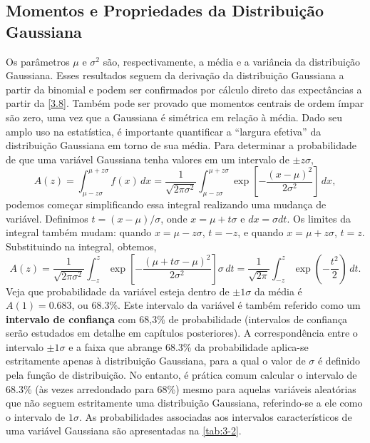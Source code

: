 \subsection{Momentos e Propriedades da Distribuição Gaussiana}

Os parâmetros $\mu$ e $\sigma^2$ são, respectivamente, a média e a variância da distribuição Gaussiana. Esses resultados seguem da derivação da distribuição Gaussiana a partir da binomial e podem ser confirmados por cálculo direto das expectâncias a partir da \autoref{3.8}. Também pode ser provado que momentos centrais de ordem ímpar são zero, uma vez que a Gaussiana é simétrica em relação à média. Dado seu amplo uso na estatística, é importante quantificar a ``largura efetiva'' da distribuição Gaussiana em torno de sua média. Para determinar a probabilidade de que uma variável Gaussiana tenha valores em um intervalo de $\pm z\sigma$,
\begin{equation*}
A(z) = \int_{\mu - z \sigma}^{\mu + z \sigma} f(x) \, dx = \dfrac{1}{\sqrt{2\pi\sigma^2}} \int_{\mu - z \sigma}^{\mu + z \sigma}  \exp\left[-\dfrac{(x - \mu)^2}{2\sigma^2}\right] \, dx,
\end{equation*}
podemos começar simplificando essa integral realizando uma mudança de variável. Definimos $t = (x - \mu) / \sigma$, onde $x = \mu + t\sigma$ e $dx = \sigma dt$. Os limites da integral também mudam: quando $x = \mu - z\sigma$, $t = -z$, e quando $x = \mu + z\sigma$, $t = z$. Substituindo na integral, obtemos,
\begin{equation}\label{3.11}
A(z) = \dfrac{1}{\sqrt{2\pi\sigma^2}} \int_{-z}^{z} \exp\left[-\dfrac{(\mu + t\sigma - \mu)^2}{2\sigma^2}\right] \sigma \,dt = \dfrac{1}{\sqrt{2\pi}} \int_{-z}^{z} \exp\left(-\dfrac{t^2}{2}\right) \, dt.
\end{equation}
Veja que probabilidade da variável esteja dentro de $\pm 1\sigma$ da média é $A(1) = 0.683$, ou $68.3\%$. Este intervalo da variável é também referido como um \textbf{intervalo de confiança} com 68,3\% de probabilidade (intervalos de confiança serão estudados em detalhe em capítulos posteriores). A correspondência entre o intervalo $\pm 1\sigma$ e a faixa que abrange 68.3\% da probabilidade aplica-se estritamente apenas à distribuição Gaussiana, para a qual o valor de $\sigma$ é definido pela função de distribuição. No entanto, é prática comum calcular o intervalo de 68.3\% (às vezes arredondado para 68\%) mesmo para aquelas variáveis aleatórias que não seguem estritamente uma distribuição Gaussiana, referindo-se a ele como o intervalo de $1\sigma$. As probabilidades associadas aos intervalos característicos de uma variável Gaussiana são apresentadas na \autoref{tab:3-2}.

